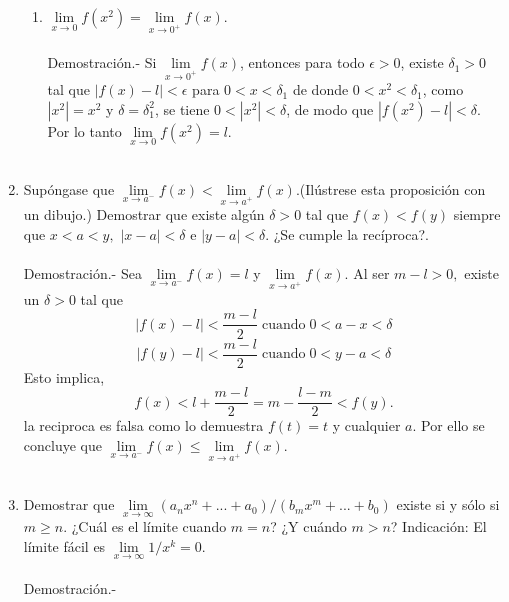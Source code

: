 \begin{enumerate}
\begin{enumerate}[\bfseries (i)]
    \item $\lim\limits_{x\to 0} f(x^2) = \lim\limits_{x\to 0^+} f(x)$.\\\\
	Demostración.-\; Si $\lim\limits_{x\to 0^+}f(x)$, entonces para todo $\epsilon>0$, existe $\delta_1>0$ tal que $|f(x)-l|<\epsilon$ para $0<x<\delta_1$ de donde $0<x^2<\delta_1$, como $|x^2|=x^2$ y $\delta=\delta_1^2$, se tiene $0<|x^2|<\delta$, de modo que $|f(x^2)-l|<\delta$. Por lo tanto $\lim\limits_{x\to 0}f(x^2)=l$.\\\\ 

\end{enumerate}

\item Supóngase que $\lim\limits_{x\to a^-}f(x)<\lim\limits_{x\to a^+}f(x).$(Ilústrese esta proposición con un dibujo.) Demostrar que existe algún $\delta > 0$ tal que $f(x)<f(y)$ siempre que $x<a<y,$ $|x-a|<\delta$ e $|y-a|<\delta$. ¿Se cumple la recíproca?.\\\\
    Demostración.-\; Sea $\lim\limits_{x\to a^-}f(x)=l$ y $\lim\limits_{x\to a^+}f(x)$. Al ser $m-l>0,$ existe un $\delta>0$ tal que 
    $$|f(x)-l|<\dfrac{m-l}{2}\; \mbox{cuando}\; 0<a-x<\delta$$
    $$|f(y)-l|<\dfrac{m-l}{2}\; \mbox{cuando}\; 0<y-a<\delta$$
    Esto implica, $$f(x)<l+\dfrac{m-l}{2}=m-\dfrac{l-m}{2}<f(y).$$
    la reciproca es falsa como lo demuestra $f(t)=t$ y cualquier $a$. Por ello se concluye que $\lim\limits_{x\to a^-}f(x) \leq \lim\limits_{x\to a^+}f(x)$.\\\\

\item Demostrar que $\lim\limits_{x\to \infty} \left(a_nx^n + ... + a_0\right)/\left(b_mx^m + ... + b_0\right)$ existe si y sólo si $m\geq n.$ ¿Cuál es el límite cuando $m=n$? ¿Y cuándo $m>n$? Indicación: El límite fácil es $\lim\limits_{x\to \infty} 1/x^k = 0$.\\\\
    Demostración.-\;

\end{enumerate}
